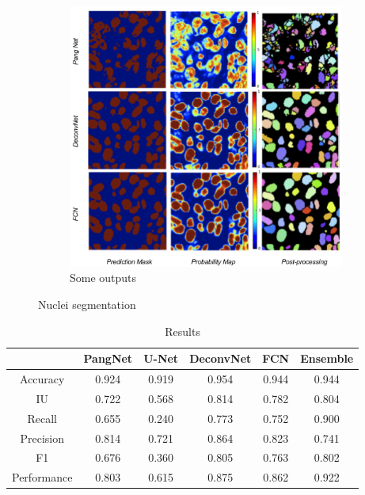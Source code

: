 \documentclass[a4paper,10pt,twocolumn]{article}
\begin{document}
\begin{figure}
    \begin{subfigure}[t]{\textwidth}
    \centering
       \hspace{-0.6cm}
       \includegraphics[width=0.8\linewidth]{Test} 
        \caption{Some outputs} \label{fig:outputs}
    \end{subfigure}
    \caption{Nuclei segmentation}
    \label{fig:all}
\end{figure}


 \begin{table}[!ht]
\centering
\begin{tabular}{|c|c|c|c|c|c|}
\hline
  & PangNet & U-Net & DeconvNet & FCN & Ensemble\\
 \hline
Accuracy  &  0.924 & 0.919 & 0.954 &0.944 & 0.944  \\
IU   &    0.722 & 0.568 & 0.814 & 0.782 & 0.804 \\
Recall     &  0.655 & 0.240 & 0.773 & 0.752 & 0.900 \\
Precision   &  0.814 & 0.721 & 0.864 & 0.823 & 0.741 \\
F1    &  0.676 & 0.360 & 0.805 & 0.763  & 0.802\\
Performance    &  0.803 & 0.615 & 0.875 & 0.862 & 0.922 \\
\hline
\end{tabular}
\caption{Results}
\label{tab:res}
\end{table}
\end{document}
